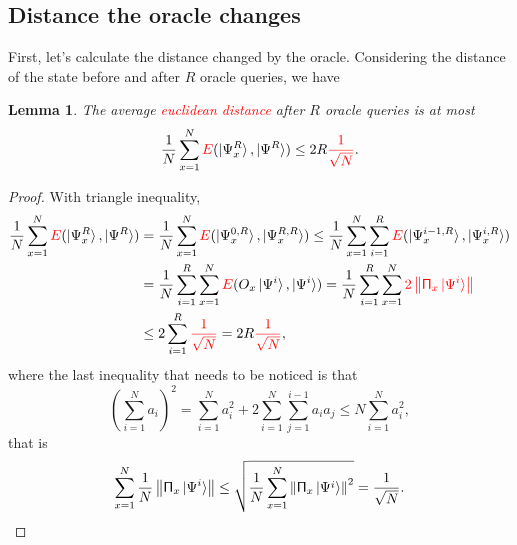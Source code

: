 \documentclass[a4paper,10pt]{book}
\newtheorem{lemma}{Lemma}[section]
\numberwithin{equation}{section}
\begin{document}
\subsection{\label{DistanceByOracle}Distance the oracle changes}

First, let's calculate the distance changed by the oracle. Considering the distance of the state before and after $R$ oracle queries, we have
\begin{lemma}
    The average \textcolor{red}{euclidean distance} after $R$ oracle queries is at most
    \begin{equation}
        \frac{1}{N}\sum_{x=1}^{N}\textcolor{red}{E}(\ket{\Psi_{x}^{R}},\ket{\Psi^{R}})\leq 2R\textcolor{red}{\frac{1}{\sqrt{N}}}.
    \end{equation}
\end{lemma}
\begin{proof}
    With triangle inequality,
    \begin{equation*}
        \begin{split}
            \frac{1}{N}\sum_{x=1}^{N}\textcolor{red}{E}(\ket{\Psi_{x}^{R}},\ket{\Psi^{R}})
             & = \frac{1}{N}\sum_{x=1}^{N}\textcolor{red}{E}(\ket{\Psi_{x}^{0,R}},\ket{\Psi_{x}^{R,R}})
            \leq \frac{1}{N}\sum_{x=1}^{N}\sum_{i=1}^{R}\textcolor{red}{E}(\ket{\Psi_{x}^{i-1,R}},\ket{\Psi_{x}^{i,R}}) \\
             & = \frac{1}{N}\sum_{i=1}^{R}\sum_{x=1}^{N}\textcolor{red}{E}(O_{x}\ket{\Psi^{i}},\ket{\Psi^{i}})
            = \frac{1}{N}\sum_{i=1}^{R}\sum_{x=1}^{N}\textcolor{red}{2\left\|\mathsf{\Pi}_{x}\ket{\Psi^{i}}\right\|}    \\
             & \leq 2\sum_{i=1}^{R}\textcolor{red}{\frac{1}{\sqrt{N}}} = 2R\textcolor{red}{\frac{1}{\sqrt{N}}},
        \end{split}
    \end{equation*}
    where the last inequality that needs to be noticed is that
    \begin{equation}\label{Cauchy-Schwarz}
        \left(\sum_{i=1}^{N}a_{i}\right)^{2}=\sum_{i=1}^{N}a_{i}^{2}+2\sum_{i=1}^{N}\sum_{j=1}^{i-1}a_{i}a_{j}\leq N\sum_{i=1}^{N}a_{i}^{2},
    \end{equation}
    that is
    \begin{equation*}
        \sum_{x=1}^{N}\frac{1}{N}\left\|\mathsf{\Pi}_{x}\ket{\Psi^{i}}\right\|\leq \sqrt{\frac{1}{N}\sum_{x=1}^{N}\left\|\mathsf{\Pi}_{x}\ket{\Psi^{i}}\right\|^{2}}=\frac{1}{\sqrt{N}}. \qedhere
    \end{equation*}
\end{proof}
\end{document}
